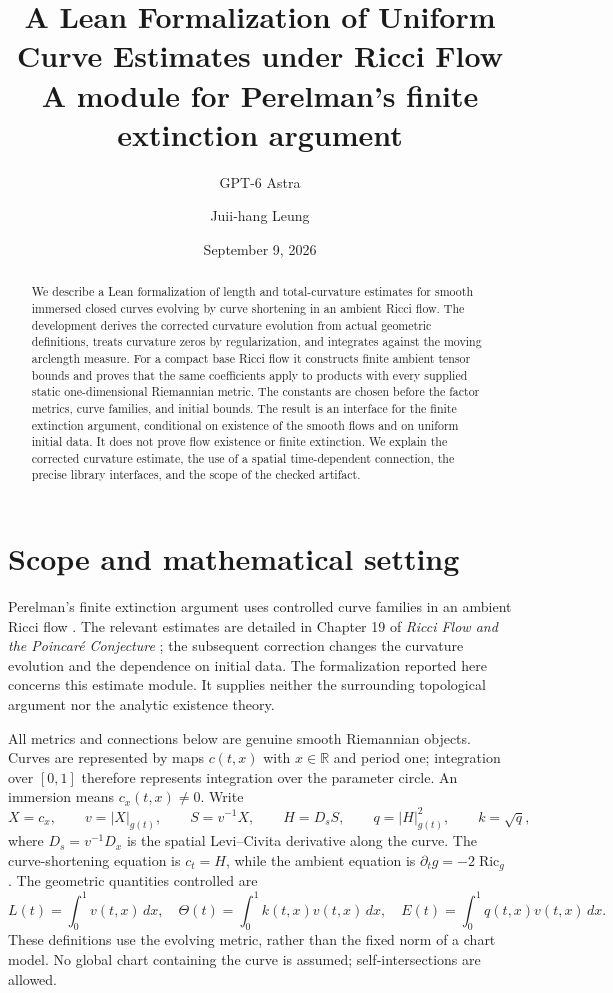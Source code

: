 \documentclass[11pt]{article}
\title{A Lean Formalization of Uniform Curve Estimates under Ricci Flow\\[0.5em]
\large A module for Perelman's finite extinction argument}
\author{GPT-6 Astra \and Juii-hang Leung}
\date{September 9, 2026}
\theoremstyle{remark}\newtheorem{remark}[theorem]{Remark}
\newcommand{\Ric}{\operatorname{Ric}}
\newcommand{\R}{\mathbb R}
\begin{document}
\maketitle
\begin{abstract}
We describe a Lean formalization of length and total-curvature estimates for
smooth immersed closed curves evolving by curve shortening in an ambient Ricci
flow. The development derives the corrected curvature evolution from actual
geometric definitions, treats curvature zeros by regularization, and integrates
against the moving arclength measure. For a compact base Ricci flow it constructs
finite ambient tensor bounds and proves that the same coefficients apply to
products with every supplied static one-dimensional Riemannian metric. The
constants are chosen before the factor metrics, curve families, and initial
bounds. The result is an interface for the finite extinction argument, conditional
on existence of the smooth flows and on uniform initial data. It does not prove
flow existence or finite extinction. We explain the corrected curvature
estimate, the use of a spatial time-dependent connection, the
precise library interfaces, and the scope of the checked artifact.
\end{abstract}

\section{Scope and mathematical setting}
Perelman's finite extinction argument uses controlled curve families in an
ambient Ricci flow \cite{perelman2003}. The relevant estimates are detailed in
Chapter 19 of \emph{Ricci Flow and the Poincar\'e Conjecture} \cite{ricciflow2007};
the subsequent correction \cite{curveestimates2015} changes the curvature
evolution and the dependence on initial data. The formalization reported here
concerns this estimate module. It supplies
neither the surrounding topological argument nor the analytic existence theory.

All metrics and connections below are genuine smooth Riemannian objects. Curves
are represented by maps $c(t,x)$ with $x\in\R$ and period one; integration over
$[0,1]$ therefore represents integration over the parameter circle. An immersion
means $c_x(t,x)\ne0$. Write
\[
 X=c_x,\qquad v=|X|_{g(t)},\qquad S=v^{-1}X,\qquad
 H=D_sS,\qquad q=|H|_{g(t)}^2,\qquad k=\sqrt q,
\]
where $D_s=v^{-1}D_x$ is the spatial Levi--Civita derivative along the curve. The
curve-shortening equation is $c_t=H$, while the ambient equation is
$\partial_tg=-2\Ric_g$. The geometric quantities controlled are
\[
 L(t)=\int_0^1v(t,x)\,dx,\quad
 \Theta(t)=\int_0^1 k(t,x)v(t,x)\,dx,\quad
 E(t)=\int_0^1q(t,x)v(t,x)\,dx.
\]
These definitions use the evolving metric, rather than the fixed norm of a chart
model. No global chart containing the curve is assumed; self-intersections are
allowed.
\end{document}
